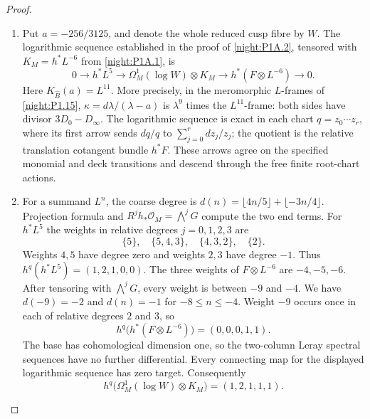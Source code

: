 \begin{proof}
\begin{enumerate}[label=\arabic*.]
\item Put $a=-256/3125$, and denote the whole reduced cusp fibre by
$W$.  The logarithmic sequence established in the proof of
\cref{night:P1A.2}, tensored with $K_M=h^*L^{-6}$ from
\cref{night:P1A.1}, is
\[
0\longrightarrow h^*L^5
\longrightarrow\Omega^1_M(\log W)\otimes K_M
\longrightarrow h^*(F\otimes L^{-6})\longrightarrow0.
\]
Here $K_{\widehat B}(a)=L^{11}$.  More precisely, in the meromorphic
$L$-frames of \cref{night:P1.15},
$\kappa=d\lambda/(\lambda-a)$ is $\lambda^9$ times the
$L^{11}$-frame: both sides have divisor $3D_0-D_\infty$.
The logarithmic sequence is exact in each chart
$q=z_0\cdots z_r$, where its first arrow sends $dq/q$ to
$\sum_{j=0}^r dz_j/z_j$; the quotient is the relative translation
cotangent bundle $h^*F$.  These arrows agree on the specified
monomial and deck transitions and descend through the free finite
root-chart actions.

\item For a summand $L^n$, the coarse degree is
$d(n)=\lfloor4n/5\rfloor+\lfloor-3n/4\rfloor$.
Projection formula and
$R^jh_*\mathcal O_M=\bigwedge^jG$ compute the two end terms.
For $h^*L^5$ the weights in relative degrees $j=0,1,2,3$ are
\[
\{5\},\quad\{5,4,3\},\quad\{4,3,2\},\quad\{2\}.
\]
Weights $4,5$ have degree zero and weights $2,3$ have degree $-1$.
Thus $h^q(h^*L^5)=(1,2,1,0,0)$.
The three weights of $F\otimes L^{-6}$ are $-4,-5,-6$.
After tensoring with $\bigwedge^jG$, every weight is between
$-9$ and $-4$.  We have $d(-9)=-2$ and $d(n)=-1$ for
$-8\le n\le-4$.  Weight $-9$ occurs once in each of relative
degrees $2$ and $3$, so
\[
h^q\bigl(h^*(F\otimes L^{-6})\bigr)=(0,0,0,1,1).
\]
The base has cohomological dimension one, so the two-column Leray
spectral sequences have no further differential.  Every connecting
map for the displayed logarithmic sequence has zero target.
Consequently
\[
h^q\bigl(\Omega^1_M(\log W)\otimes K_M\bigr)=(1,2,1,1,1).
\]


\end{enumerate}
\end{proof}
